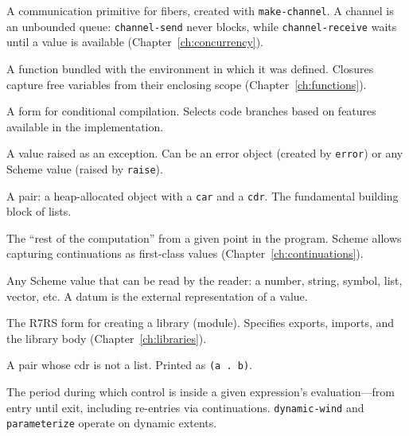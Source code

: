 \begin{description}[leftmargin=2em, style=nextline]
\item[channel]
A communication primitive for fibers, created with \texttt{make-channel}. A channel is an unbounded queue: \texttt{channel-send} never blocks, while \texttt{channel-receive} waits until a value is available (Chapter~\ref{ch:concurrency}).

\item[closure]
A function bundled with the environment in which it was defined. Closures capture free variables from their enclosing scope (Chapter~\ref{ch:functions}).

\item[cond-expand]
A form for conditional compilation. Selects code branches based on features available in the implementation.

\item[condition]
A value raised as an exception. Can be an error object (created by \texttt{error}) or any Scheme value (raised by \texttt{raise}).

\item[cons cell]
A pair: a heap-allocated object with a \texttt{car} and a \texttt{cdr}. The fundamental building block of lists.

\item[continuation]
The ``rest of the computation'' from a given point in the program. Scheme allows capturing continuations as first-class values (Chapter~\ref{ch:continuations}).

\item[datum]
Any Scheme value that can be read by the reader: a number, string, symbol, list, vector, etc. A datum is the external representation of a value.

\item[define-library]
The R7RS form for creating a library (module). Specifies exports, imports, and the library body (Chapter~\ref{ch:libraries}).

\item[dotted pair]
A pair whose cdr is not a list. Printed as \texttt{(a . b)}.

\item[dynamic extent]
The period during which control is inside a given expression's evaluation---from entry until exit, including re-entries via continuations. \texttt{dynamic-wind} and \texttt{parameterize} operate on dynamic extents.


\end{description}

